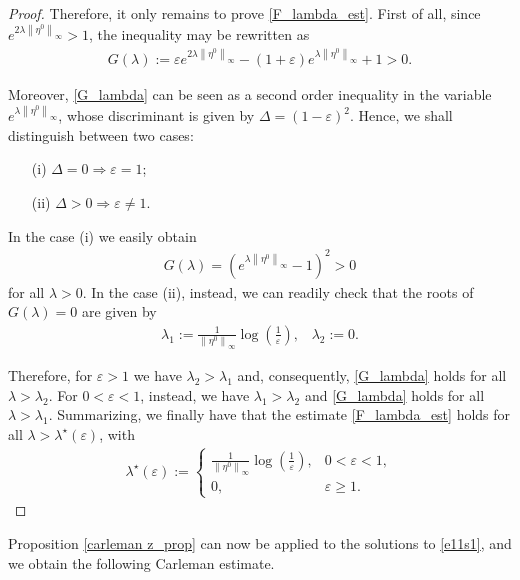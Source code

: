\documentclass{amsart}    %
\newcommand{\D}{\displaystyle}
\newcommand{\norm}[2]{\left\|#1\right\|_{#2}}
\begin{document}
\begin{proof}
Therefore, it only remains to prove \eqref{F_lambda_est}. First of all, since $e^{2\lambda\norm{\eta^0}{\infty}}>1$, the inequality  may be rewritten as
\begin{align}\label{G_lambda}
	G(\lambda):=\varepsilon e^{2\lambda\norm{\eta^0}{\infty}} - (1+\varepsilon)e^{\lambda\norm{\eta^0}{\infty}} + 1> 0.
\end{align}

Moreover, \eqref{G_lambda} can be seen as a second order inequality in the variable $e^{\lambda\norm{\eta^0}{\infty}}$, whose discriminant is given by $\Delta = (1-\varepsilon)^2$. Hence, we shall distinguish between two cases:
\begin{itemize}
	\item[(i)] $\Delta = 0\Rightarrow \varepsilon=1$;
	\item[(ii)] $\Delta>0\Rightarrow \varepsilon\neq 1$.
\end{itemize}
In the case (i) we easily obtain 
\begin{align*}
	G(\lambda)=\left(e^{\lambda\norm{\eta^0}{\infty}}-1\right)^2>0
\end{align*} 
for all $\lambda>0$. In the case (ii), instead, we can readily check that the roots of $G(\lambda)=0$ are given by 
\begin{align*}
	\lambda_1:=\frac{1}{\norm{\eta^0}{\infty}}\log\left(\frac 1\varepsilon\right),\;\;\; \lambda_2:=0.
\end{align*}

Therefore, for $\varepsilon>1$ we have $\lambda_2>\lambda_1$ and, consequently, \eqref{G_lambda} holds for all $\lambda>\lambda_2$. For $0<\varepsilon<1$, instead, we have $\lambda_1>\lambda_2$ and \eqref{G_lambda} holds for all $\lambda>\lambda_1$. Summarizing, we finally have that the estimate \eqref{F_lambda_est} holds for all $\lambda>\lambda^\star(\varepsilon)$, with
\begin{align}\label{lambda_zero}
	\lambda^\star(\varepsilon):=\begin{cases}
	\D\frac{1}{\norm{\eta^0}{\infty}}\log\left(\frac 1\varepsilon\right), & 0<\varepsilon<1,
	\\
	0, & \varepsilon\geq 1.
	\end{cases}
\end{align}
\end{proof}

Proposition \ref{carleman z_prop} can now be applied to the solutions to \eqref{e11s1}, and we obtain the following Carleman estimate.
\end{document}
